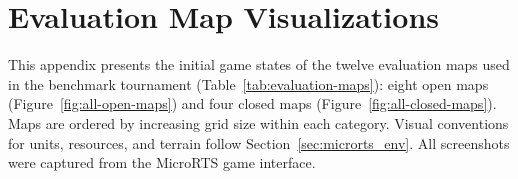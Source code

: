 \chapter{Evaluation Map Visualizations}
\label{app:maps}

This appendix presents the initial game states of the twelve evaluation maps used in the benchmark tournament (Table~\ref{tab:evaluation-maps}): eight open maps (Figure~\ref{fig:all-open-maps}) and four closed maps (Figure~\ref{fig:all-closed-maps}). Maps are ordered by increasing grid size within each category. Visual conventions for units, resources, and terrain follow Section~\ref{sec:microrts_env}. All screenshots were captured from the MicroRTS game interface.

